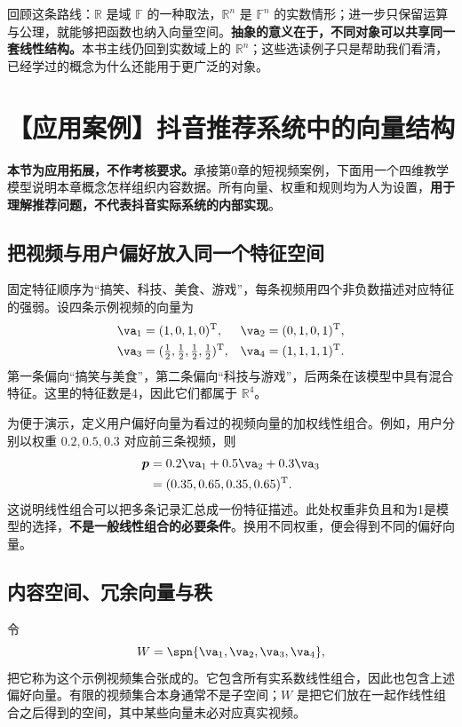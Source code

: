 \documentclass[a4paper,12pt,twoside,openany,fontset=none]{ctexbook}
\numberwithin{equation}{chapter}
\begin{document}
回顾这条路线：$\mathbb{R}$ 是域 $\mathbb{F}$ 的一种取法，$\mathbb{R}^n$ 是 $\mathbb{F}^n$ 的实数情形；进一步只保留运算与公理，就能够把函数也纳入向量空间。\textbf{抽象的意义在于，不同对象可以共享同一套线性结构。}本书主线仍回到实数域上的 $\mathbb{R}^n$；这些选读例子只是帮助我们看清，已经学过的概念为什么还能用于更广泛的对象。


\section{【应用案例】抖音推荐系统中的向量结构}
\label{sec:one-application}

\textbf{本节为应用拓展，不作考核要求。}承接第0章的短视频案例，下面用一个四维教学模型说明本章概念怎样组织内容数据。所有向量、权重和规则均为人为设置，\textbf{用于理解推荐问题，不代表抖音实际系统的内部实现}。

\subsection*{把视频与用户偏好放入同一个特征空间}

固定特征顺序为“搞笑、科技、美食、游戏”，每条视频用四个非负数描述对应特征的强弱。设四条示例视频的向量为
\[
\begin{aligned}
    \va_1&=(1,0,1,0)^{\mathrm T},&\va_2&=(0,1,0,1)^{\mathrm T},\\
    \va_3&=(\tfrac12,\tfrac12,\tfrac12,\tfrac12)^{\mathrm T},&
    \va_4&=(1,1,1,1)^{\mathrm T}.
\end{aligned}
\]
第一条偏向“搞笑与美食”，第二条偏向“科技与游戏”，后两条在该模型中具有混合特征。这里的特征数是4，因此它们都属于 $\mathbb{R}^4$。

为便于演示，定义用户偏好向量为看过的视频向量的加权线性组合。例如，用户分别以权重 $0.2,0.5,0.3$ 对应前三条视频，则
\[
\begin{aligned}
    \boldsymbol{p}
       &=0.2\va_1+0.5\va_2+0.3\va_3\\
       &=(0.35,0.65,0.35,0.65)^{\mathrm T}.
\end{aligned}
\]
这说明线性组合可以把多条记录汇总成一份特征描述。此处权重非负且和为1是模型的选择，\textbf{不是一般线性组合的必要条件}。换用不同权重，便会得到不同的偏好向量。

\subsection*{内容空间、冗余向量与秩}

令
\[
    W=\spn\{\va_1,\va_2,\va_3,\va_4\},
\]
把它称为这个示例视频集合张成的\textbf{}。它包含所有实系数线性组合，因此也包含上述偏好向量。有限的视频集合本身通常不是子空间；$W$ 是把它们放在一起作线性组合之后得到的空间，其中某些向量未必对应真实视频。
\end{document}
